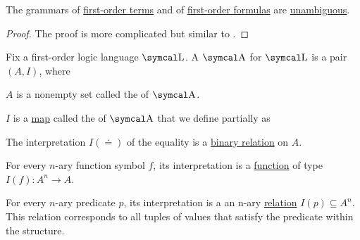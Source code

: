 \begin{proposition}\label{thm:first_order_terms_and_formulas_are_unambiguous}
  The grammars of \hyperref[def:first_order_language/term]{first-order terms} and of \hyperref[def:first_order_language/formula]{first-order formulas} are \hyperref[def:grammar_derivation/ambiguity]{unambiguous}.
\end{proposition}
\begin{proof}
  The proof is more complicated but similar to .
\end{proof}

\begin{definition}\label{def:first_order_structure}
  Fix a first-order logic language \( \CL \). A  \( \CA \) for \( \CL \) is a pair \( (A, I) \), where

  \begin{DefEnum}
     \( A \) is a nonempty set called the  of \( \CA \).

     \( I \) is a \hyperref[def:function]{map} called the  of \( \CA \) that we define partially as
    \begin{DefEnum}
       The interpretation \( I(\doteq) \) of the equality is a \hyperref[def:binary_relation]{binary relation} on \( A \).

       For every \( n \)-ary function symbol \( f \), its interpretation is a \hyperref[def:function]{function} of type \( I(f): A^n \to A \).

       For every \( n \)-ary predicate \( p \), its interpretation is a an n-ary \hyperref[def:relation]{relation} \( I(p) \subseteq A^n \). This relation corresponds to all tuples of values that satisfy the predicate within the structure.
    \end{DefEnum}
  \end{DefEnum}
\end{definition}

